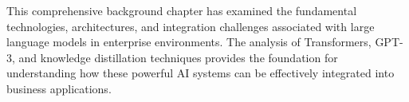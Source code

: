 This comprehensive background chapter has examined the fundamental technologies, architectures, and integration challenges associated with large language models in enterprise environments. The analysis of Transformers, GPT-3, and knowledge distillation techniques provides the foundation for understanding how these powerful AI systems can be effectively integrated into business applications.

%
%
%
%
